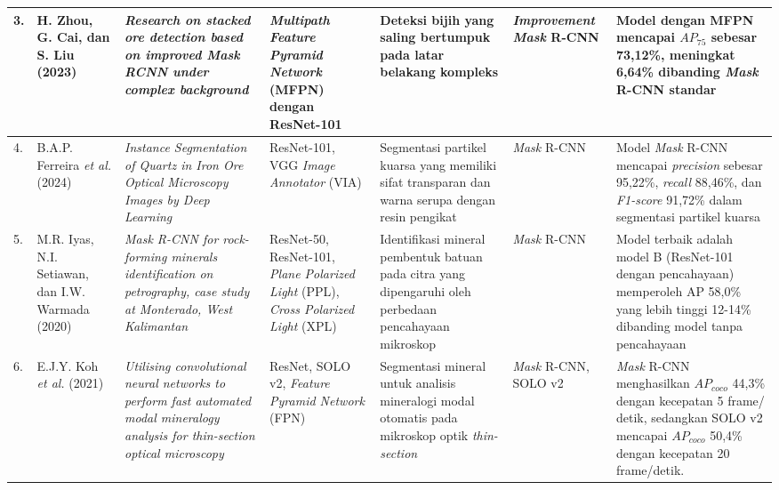 \begin{landscape}
\begin{longtable}{|p{0.2cm}|p{1.6cm}|p{2.4cm}|p{2.5cm}|p{2.5cm}|p{2.5cm}|p{3.5cm}|}
	3. & 
	H. Zhou, G. Cai, dan S. Liu (2023) \cite{ImprovedMaskRCNNOrePanggangan}& 
	\textit{Research on stacked ore detection based on improved Mask RCNN under complex background} & 
	\textit{Multipath Feature Pyramid Network} (MFPN) dengan ResNet-101 & 
	Deteksi bijih yang saling bertumpuk pada latar belakang kompleks & 
	\textit{Improvement Mask} R-CNN & 
	Model dengan MFPN mencapai $AP_{75}$ sebesar 73,12\%, meningkat 6,64\% dibanding \textit{Mask} R-CNN standar \\
	\hline

	4. & 
	B.A.P. Ferreira \textit{et al.} (2024) \cite{QuartzMicMaskrcnn} & 
	\textit{Instance Segmentation of Quartz in Iron Ore Optical Microscopy Images by Deep Learning} & 
	ResNet-101, VGG \textit{Image Annotator} (VIA) & 
	Segmentasi partikel kuarsa yang memiliki sifat transparan dan warna serupa dengan resin pengikat & 
	\textit{Mask} R-CNN & 
	Model \textit{Mask} R-CNN mencapai \textit{precision} sebesar 95,22\%, \textit{recall} 88,46\%, dan \textit{F1-score} 91,72\% dalam segmentasi partikel kuarsa \\
	\hline

	5. & 
	M.R. Iyas, N.I. Setiawan, dan I.W. Warmada (2020) \cite{maskrcnnKalimantanMic}& 
	\textit{Mask R-CNN for rock-forming minerals identification on petrography, case study at Monterado, West Kalimantan} & 
	ResNet-50, ResNet-101, \textit{Plane Polarized Light} (PPL), \textit{Cross Polarized Light} (XPL) & 
	Identifikasi mineral pembentuk batuan pada citra yang dipengaruhi oleh perbedaan pencahayaan mikroskop & 
	\textit{Mask} R-CNN & 
	Model terbaik adalah model B (ResNet-101 dengan pencahayaan) memperoleh AP 58,0\% yang lebih tinggi 12-14\% dibanding model tanpa pencahayaan \\
	\hline

	6. & 
	E.J.Y. Koh \textit{et al.} (2021) \cite{mineralogiMaskRCNNSolo}& 
	\textit{Utilising convolutional neural networks to perform fast automated modal mineralogy analysis for thin-section optical microscopy} & 
	ResNet, SOLO v2, \textit{Feature Pyramid Network} (FPN) & 
	Segmentasi mineral untuk analisis mineralogi modal otomatis pada mikroskop optik \textit{thin-section} & 
	\textit{Mask} R-CNN, SOLO v2 & 
	\textit{Mask} R-CNN menghasilkan $AP_{coco}$ 44,3\% dengan kecepatan 5 frame/ detik, sedangkan SOLO v2 mencapai $AP_{coco}$ 50,4\% dengan kecepatan 20 frame/detik. \\
	\hline

	
	

\end{longtable}
\end{landscape}
